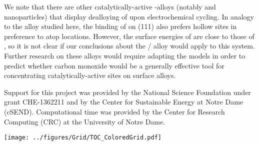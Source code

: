 \documentclass[journal = jpccck, manuscript = article]{achemso}
\begin{document}
We note that there are other catalytically-active -alloys
(notably  and  nanoparticles) that display
dealloying of  upon electrochemical cycling.\cite{Tuaev:2013fk}
In analogy to the  alloy studied here, the binding of 
on (111) also prefers hollow sites in preference to atop
locations.\cite{Campuzano:1979uq} However, the surface energies of
 are close to those of , so it is not clear if our
conclusions about the / alloy would apply to this
system.  Further research on these alloys would require adapting the
 models in order to predict whether carbon monoxide
would be a generally effective tool for concentrating
catalytically-active  sites on surface alloys.

\begin{acknowledgement}
  Support for this project was provided by the National Science
  Foundation under grant CHE-1362211 and by the Center for Sustainable
  Energy at Notre Dame (cSEND). Computational time was provided by the
  Center for Research Computing (CRC) at the University of Notre Dame.
\end{acknowledgement}
\newpage
{}


\begin{tocentry}
\center\texttt{[image: ../figures/Grid/TOC\_ColoredGrid.pdf]} 
\end{tocentry}
\end{document}
